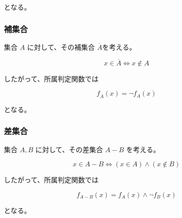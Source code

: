 \documentclass[a4paper,11pt]{ltjsarticle}
\begin{document}
となる。
\subsubsection{補集合}

集合 $A$ に対して、その補集合 $\overline{A}$を考える。

\[
x\in\overline{A}
\iff
x\notin A
\]

したがって、所属判定関数では

\[
f_{\overline{A}}(x)
=
\lnot f_A(x)
\]

となる。

\subsubsection{差集合}

集合 $A,B$ に対して、その差集合 $A-B$ を考える。

\[
x\in A-B
\iff
(x\in A)\land(x\notin B)
\]

したがって、所属判定関数では

\[
f_{A-B}(x)
=
f_A(x)\land\lnot f_B(x)
\]

となる。
\end{document}
